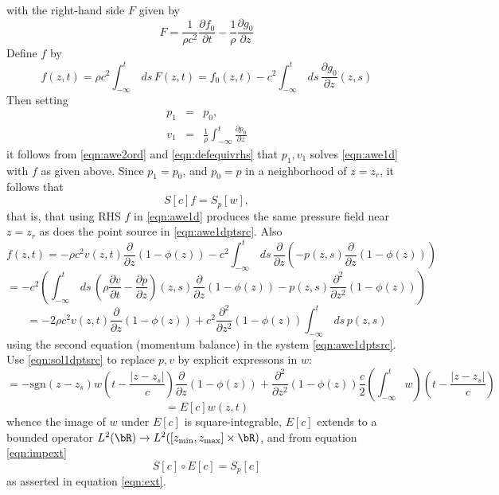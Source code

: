 with the right-hand side $F$ given by
\begin{equation}
  \label{eqn:rhs2ord}
  F = \frac{1}{\rho c^2}\frac{\partial f_0}{\partial t} -
  \frac{1}{\rho}\frac{\partial g_0}{\partial z}
\end{equation}
Define $f$ by
\begin{equation}
  \label{eqn:defequivrhs}
  f(z,t) = \rho c^2 \int_{-\infty}^t \,ds\,F(z,t) =  f_0(z,t) - c^2\int_{-\infty}^{t}\,ds\,\frac{\partial
    g_0}{\partial z}(z,s)
\end{equation}
Then setting
\begin{eqnarray*}
  p_1 &=& p_0,\\
  v_1 &=& \frac{1}{\rho}\int_{-\infty}^t\frac{\partial p_0}{\partial z}
\end{eqnarray*}
it follows from \ref{eqn:awe2ord} and \ref{eqn:defequivrhs} that
$p_1,v_1$ solves \ref{eqn:awe1d} with $f$ as given above. Since
$p_1=p_0$, and $p_0=p$ in a neighborhood of $z=z_r$, it follows that
\begin{equation}
  \label{eqn:impext}
  S[c]f = S_p[w],
\end{equation}
that is, that using RHS $f$ in \ref{eqn:awe1d} produces the same
pressure field near $z=z_r$ as does the point source in
\ref{eqn:awe1dptsrc}. Also
\[
  f(z,t) = -\rho c^2 v(z,t) \frac{\partial}{\partial z}(1-\phi(z)) - c^2
  \int_{-\infty}^t\,ds\, \frac{\partial}{\partial z}\left(-p(z,s) \frac{\partial}{\partial z}(1-\phi(z))\right)
\]
\[
  = - c^2 \left(\int_{-\infty}^t\,ds\,\left( \rho \frac{\partial v}{\partial
      t} -\frac{\partial p}{\partial
      z}\right)(z,s)\frac{\partial}{\partial z}(1-\phi(z))
  -p(z,s)\frac{\partial^2}{\partial z^2}(1-\phi(z)) \right)
\]
\[
  = -2\rho c^2 v(z,t)\frac{\partial}{\partial z}(1-\phi(z)) +
  c^2\frac{\partial^2}{\partial z^2}(1-\phi(z))\int_{-\infty}^t
  \,ds\,p(z,s)
\]
using the second equation (momentum balance) in the system
\ref{eqn:awe1dptsrc}. Use \ref{eqn:sol1dptsrc} to replace $p,v$ by
explicit expressons in $w$:
\[
    = -\mbox{sgn}(z-z_s)w\left(t -\frac{|z-z_s|}{c}\right)\frac{\partial}{\partial z}(1-\phi(z)) +
  \frac{\partial^2}{\partial z^2}(1-\phi(z))\frac{c}{2}\left(\int_{-\infty}^tw\right)\left(t - \frac{|z-z_s|}{c}\right)
\]
\begin{equation}
  \label{eqn:defextop}
  =E[c]w(z,t)
\end{equation}
whence the image of $w$ under $E[c]$ is square-integrable,
$E[c]$ extends to a bounded operator $L^2(\bR) \rightarrow
L^2([z_{\rm min},z_{\rm max}]\times \bR)$, and from equation \ref{eqn:impext}
\begin{equation}
  \label{eqn:extapp}
S[c]\circ E[c] = S_p[c]
\end{equation}
as asserted in equation \ref{eqn:ext}.




